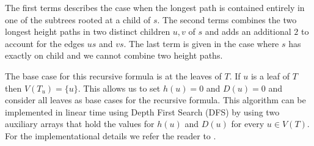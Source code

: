 The first terms describes the case when the longest path is contained entirely in one of the subtrees rooted at a child of $s$. The second terms combines the two longest height paths in two distinct children $u, v$ of $s$ and adds an additional $2$ to account for the edges $us$ and $vs$. The last term is given in the case where $s$ has exactly on child and we cannot combine two height paths.

The base case for this recursive formula is at the leaves of $T$. If $u$ is a leaf of $T$ then $V(T_u) = \{u\}$. This allows us to set $h(u) = 0$ and $D(u) = 0$ and consider all leaves as base cases for the recursive formula. This algorithm can be implemented in linear time using Depth First Search (DFS)  \cite[p. 603]{intro-to-algo} by using two auxiliary arrays that hold the values for $h(u)$ and $D(u)$ for every $u \in V(T)$. For the implementational details we refer the reader to \cite{dp-implementation}.


%



